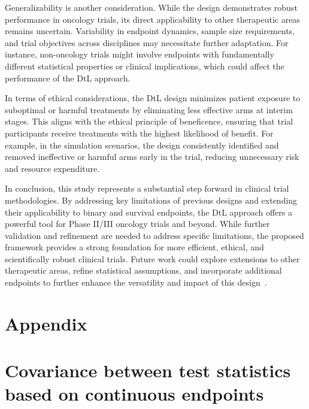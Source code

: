 \documentclass[11pt, a4paper]{article}\usepackage[]{graphicx}\usepackage[]{xcolor}
\begin{document}
Generalizability is another consideration. While the design demonstrates robust performance in oncology trials, its direct applicability to other therapeutic areas remains uncertain. Variability in endpoint dynamics, sample size requirements, and trial objectives across disciplines may necessitate further adaptation. For instance, non-oncology trials might involve endpoints with fundamentally different statistical properties or clinical implications, which could affect the performance of the DtL approach.

In terms of ethical considerations, the DtL design minimizes patient exposure to suboptimal or harmful treatments by eliminating less effective arms at interim stages. This aligns with the ethical principle of beneficence, ensuring that trial participants receive treatments with the highest likelihood of benefit. For example, in the simulation scenarios, the design consistently identified and removed ineffective or harmful arms early in the trial, reducing unnecessary risk and resource expenditure.


In conclusion, this study represents a substantial step forward in clinical trial methodologies. By addressing key limitations of previous designs and extending their applicability to binary and survival endpoints, the DtL approach offers a powerful tool for Phase II/III oncology trials and beyond. While further validation and refinement are needed to address specific limitations, the proposed framework provides a strong foundation for more efficient, ethical, and scientifically robust clinical trials. Future work could explore extensions to other therapeutic areas, refine statistical assumptions, and incorporate additional endpoints to further enhance the versatility and impact of this design~\citep{Mensh2017}.



\pagebreak

\appendix
\section*{Appendix} \label{sec:app}
\renewcommand{\thesection}{\Alph{section}}

\section{Covariance between test statistics based on continuous endpoints} \label{sec:app_derivations}
\end{document}
